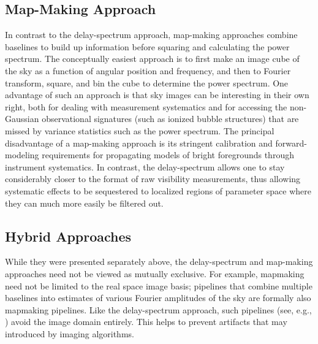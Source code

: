 \documentclass[preprint,11pt]{aastex}
\begin{document}
\subsection{Map-Making Approach}
\label{sec:mapapproach}
In contrast to the delay-spectrum approach, map-making approaches combine baselines to build up information before squaring and calculating the power spectrum.  The conceptually easiest approach is to first make an image cube of the sky as a function of angular position and frequency, and then to Fourier transform, square, and bin the cube to determine the power spectrum. One advantage of such an approach is that sky images can be interesting in their own right, both for dealing with measurement systematics and for accessing the non-Gaussian observational signatures (such as ionized bubble structures) that are missed by variance statistics such as the power spectrum. The principal disadvantage of a map-making approach is its stringent calibration and forward-modeling requirements for propagating models of bright foregrounds through instrument systematics. In contrast, the delay-spectrum allows one to stay considerably closer to the format of raw visibility measurements, thus allowing systematic effects to be sequestered to localized regions of parameter space where they can much more easily be filtered out.

\subsection{Hybrid Approaches}
\label{sec:hybridapproach}

While they were presented separately above, the delay-spectrum and map-making approaches need not be viewed as mutually exclusive. For example, mapmaking need not be limited to the real space image basis; pipelines that combine multiple baselines into estimates of various Fourier amplitudes of the sky are formally also mapmaking pipelines. Like the delay-spectrum approach, such pipelines (see, e.g., \citealt{trott_et_al2016}) avoid the image domain entirely. This helps to prevent artifacts that may introduced by imaging algorithms.
\end{document}
